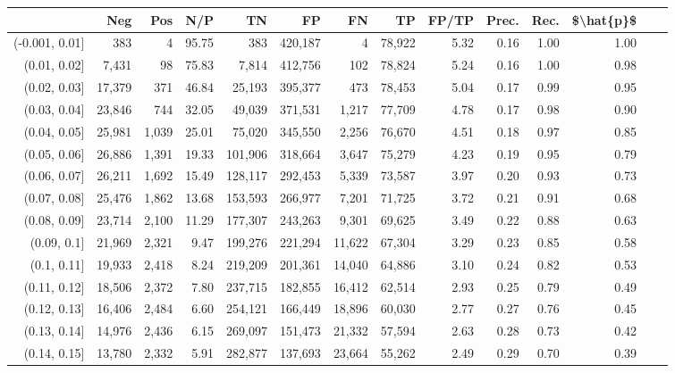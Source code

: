 \begin{tabular}{rrrrrrrrrrrrrr}
\toprule
{} &     Neg &    Pos &    N/P &       TN &       FP &      FN &      TP & FP/TP & Prec. &  Rec. & \$\textbackslash hat\{p\}\$ \\
\midrule
(-0.001, 0.01] &     383 &      4 &  95.75 &      383 &  420,187 &       4 &  78,922 &  5.32 &  0.16 &  1.00 &      1.00 \\
(0.01, 0.02]   &   7,431 &     98 &  75.83 &    7,814 &  412,756 &     102 &  78,824 &  5.24 &  0.16 &  1.00 &      0.98 \\
(0.02, 0.03]   &  17,379 &    371 &  46.84 &   25,193 &  395,377 &     473 &  78,453 &  5.04 &  0.17 &  0.99 &      0.95 \\
(0.03, 0.04]   &  23,846 &    744 &  32.05 &   49,039 &  371,531 &   1,217 &  77,709 &  4.78 &  0.17 &  0.98 &      0.90 \\
(0.04, 0.05]   &  25,981 &  1,039 &  25.01 &   75,020 &  345,550 &   2,256 &  76,670 &  4.51 &  0.18 &  0.97 &      0.85 \\
(0.05, 0.06]   &  26,886 &  1,391 &  19.33 &  101,906 &  318,664 &   3,647 &  75,279 &  4.23 &  0.19 &  0.95 &      0.79 \\
(0.06, 0.07]   &  26,211 &  1,692 &  15.49 &  128,117 &  292,453 &   5,339 &  73,587 &  3.97 &  0.20 &  0.93 &      0.73 \\
(0.07, 0.08]   &  25,476 &  1,862 &  13.68 &  153,593 &  266,977 &   7,201 &  71,725 &  3.72 &  0.21 &  0.91 &      0.68 \\
(0.08, 0.09]   &  23,714 &  2,100 &  11.29 &  177,307 &  243,263 &   9,301 &  69,625 &  3.49 &  0.22 &  0.88 &      0.63 \\
(0.09, 0.1]    &  21,969 &  2,321 &   9.47 &  199,276 &  221,294 &  11,622 &  67,304 &  3.29 &  0.23 &  0.85 &      0.58 \\
(0.1, 0.11]    &  19,933 &  2,418 &   8.24 &  219,209 &  201,361 &  14,040 &  64,886 &  3.10 &  0.24 &  0.82 &      0.53 \\
(0.11, 0.12]   &  18,506 &  2,372 &   7.80 &  237,715 &  182,855 &  16,412 &  62,514 &  2.93 &  0.25 &  0.79 &      0.49 \\
(0.12, 0.13]   &  16,406 &  2,484 &   6.60 &  254,121 &  166,449 &  18,896 &  60,030 &  2.77 &  0.27 &  0.76 &      0.45 \\
(0.13, 0.14]   &  14,976 &  2,436 &   6.15 &  269,097 &  151,473 &  21,332 &  57,594 &  2.63 &  0.28 &  0.73 &      0.42 \\
(0.14, 0.15]   &  13,780 &  2,332 &   5.91 &  282,877 &  137,693 &  23,664 &  55,262 &  2.49 &  0.29 &  0.70 &      0.39 \\

\end{tabular}
